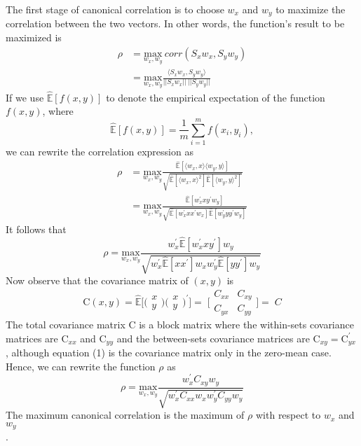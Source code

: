 \documentclass[fleqn,a4paper,11pt]{article}
\begin{document}
\noindent The first stage of canonical correlation is to choose $w_x$ and $w_y$ to maximize
the correlation between the two vectors. In other words, the function’s result
to be maximized is
\begin{align*}
\rho &= \underset{w_x,w_y}{\text{max}}\:corr(S_xw_x, S_yw_y) \\
&= \underset{w_x,w_y}{\text{max}} \frac{\langle S_xw_x,S_yw_y \rangle}{||S_xw_x||\:||S_yw_y||}
\end{align*}
\noindent If we use $\mathbb{\hat E} [f(x, y)]$ to denote the empirical expectation of the function
$f(x, y)$, where
\begin{equation*}
\mathbb{\hat E} [f(x, y)] = \frac{1}{m}{\sum \limits_{i=1}^m f(x_i, y_i)},
\end{equation*}
we can rewrite the correlation expression as
\begin{align*}
\rho &=\underset{w_x,w_y}{\text{max}} \frac{\mathbb{\hat E}[\langle w_x,x \rangle \langle w_y,y \rangle ]	}{\sqrt{\mathbb{\hat E}[\langle w_x,x \rangle ^2] \mathbb{\hat E}[\langle w_y,y \rangle  ^2]}} \\
&=\underset{w_x,w_y}{\text{max}} \frac{\mathbb{\hat E}[w_{x}^{'}xy^{'}w_y]}{\sqrt{\mathbb{\hat E}[w_{x}^{'}xx^{'}w_x] {\mathbb{\hat E} [w_{y}^{'}yy^{'}w_y] }}}
\end{align*}
It follows that
\begin{equation*}
\rho =\underset{w_x,w_y}{\text{max}} \frac{w_{x}^{'} \mathbb{\hat E}[w_{x}^{'}xy^{'}]w_y}{\sqrt{w_x^{'}\mathbb{\hat E}[xx^{'}]w_x w_{y}^{'}{\mathbb{\hat E} [yy^{'}]w_y }}}
\end{equation*}
Now observe that the covariance matrix of $(x, y)$ is
\begin{equation}
\text{C}(x,y) = \mathbb{\hat E}\Bigg[\Bigg(
\begin{matrix}
x \\
y
\end{matrix}
\Bigg)\Bigg(
\begin{matrix}
x \\
y
\end{matrix} \Bigg)^{'}\Bigg] =\; \Bigg[
\begin{matrix}
C_{xx} & C_{xy} \\
C_{yx} & C_{yy}
\end{matrix} \Bigg] = \;C
\end{equation}
\noindent The total covariance matrix $\text{C}$ is a block matrix where the within-sets covariance
matrices are $\text{C}_{xx}$ and $\text{C}_{yy}$ and the between-sets covariance matrices
are $\text{C}_{xy} = \text{C}_{yx}^{'}$
, although equation (1) is the covariance matrix only in the
zero-mean case.\\
Hence, we can rewrite the function $\rho$ as
\begin{equation}
\rho =\underset{w_x,w_y}{\text{max}} \frac{w_{x}^{'} C_{xy} w_y}{\sqrt{w_x^{'}C_{xx} w_x w_{y}^{'}{C_{yy} w_y }}}
\end{equation}
\noindent The maximum canonical correlation is the maximum of $\rho$ with respect to
$w_x$ and $w_y$ \\.
\end{document}

